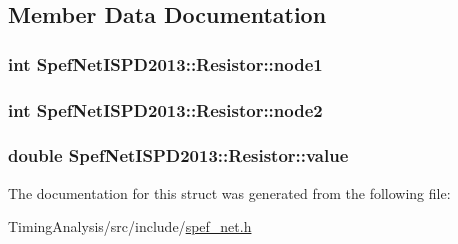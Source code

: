 \subsection{Member Data Documentation}
\hypertarget{structSpefNetISPD2013_1_1Resistor_a3916280dff15e9c4bccafdaba9d40bac}{
\subsubsection[{node1}]{\setlength{\rightskip}{0pt plus 5cm}int Spef\-Net\-I\-S\-P\-D2013\-::\-Resistor\-::node1}}\label{structSpefNetISPD2013_1_1Resistor_a3916280dff15e9c4bccafdaba9d40bac}
\hypertarget{structSpefNetISPD2013_1_1Resistor_a7da9cba467501e28de314d284c3cf000}{
\subsubsection[{node2}]{\setlength{\rightskip}{0pt plus 5cm}int Spef\-Net\-I\-S\-P\-D2013\-::\-Resistor\-::node2}}\label{structSpefNetISPD2013_1_1Resistor_a7da9cba467501e28de314d284c3cf000}
\hypertarget{structSpefNetISPD2013_1_1Resistor_aa63c1d820917f71cd4ff2cbf1e83696d}{
\subsubsection[{value}]{\setlength{\rightskip}{0pt plus 5cm}double Spef\-Net\-I\-S\-P\-D2013\-::\-Resistor\-::value}}\label{structSpefNetISPD2013_1_1Resistor_aa63c1d820917f71cd4ff2cbf1e83696d}


The documentation for this struct was generated from the following file\-:\begin{DoxyCompactItemize}
\item 
Timing\-Analysis/src/include/\hyperlink{spef__net_8h}{spef\-\_\-net.\-h}\end{DoxyCompactItemize}
